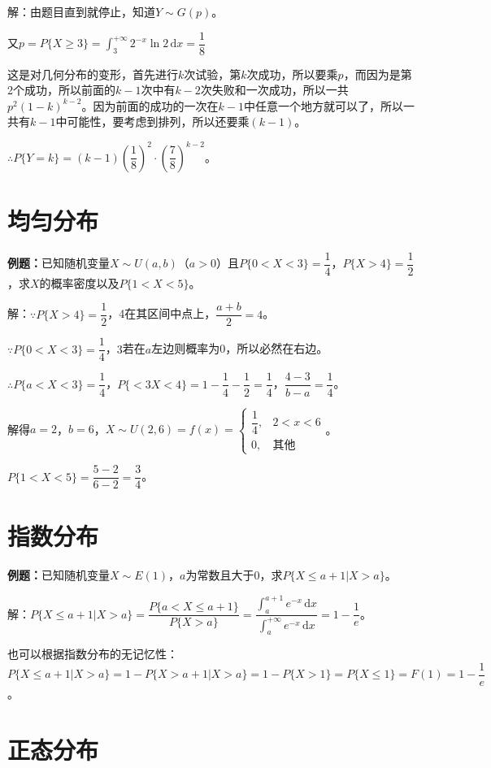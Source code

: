 \documentclass[UTF8, 12pt]{ctexart}
\begin{document}
解：由题目直到就停止，知道$Y\sim G(p)$。

又$p=P\{X\geqslant3\}=\int_3^{+\infty}2^{-x}\ln2\,\textrm{d}x=\dfrac{1}{8}$

这是对几何分布的变形，首先进行$k$次试验，第$k$次成功，所以要乘$p$，而因为是第2个成功，所以前面的$k-1$次中有$k-2$次失败和一次成功，所以一共$p^2(1-k)^{k-2}$。因为前面的成功的一次在$k-1$中任意一个地方就可以了，所以一共有$k-1$中可能性，要考虑到排列，所以还要乘$(k-1)$。

$\therefore P\{Y=k\}=(k-1)\left(\dfrac{1}{8}\right)^2\cdot\left(\dfrac{7}{8}\right)^{k-2}$。

\section{均匀分布}

\textbf{例题：}已知随机变量$X\sim U(a,b)$（$a>0$）且$P\{0<X<3\}=\dfrac{1}{4}$，$P\{X>4\}=\dfrac{1}{2}$，求$X$的概率密度以及$P\{1<X<5\}$。

解：$\because P\{X>4\}=\dfrac{1}{2}$，4在其区间中点上，$\dfrac{a+b}{2}=4$。

$\because P\{0<X<3\}=\dfrac{1}{4}$，$3$若在$a$左边则概率为0，所以必然在右边。

$\therefore P\{a<X<3\}=\dfrac{1}{4}$，$P\{<3X<4\}=1-\dfrac{1}{4}-\dfrac{1}{2}=\dfrac{1}{4}$，$\dfrac{4-3}{b-a}=\dfrac{1}{4}$。

解得$a=2$，$b=6$，$X\sim U(2,6)=f(x)=\left\{\begin{array}{ll}
    \dfrac{1}{4}, & 2<x<6 \\
    0, & \text{其他}
\end{array}\right.$。

$P\{1<X<5\}=\dfrac{5-2}{6-2}=\dfrac{3}{4}$。

\section{指数分布}

\textbf{例题：}已知随机变量$X\sim E(1)$，$a$为常数且大于0，求$P\{X\leqslant a+1|X>a\}$。

解：$P\{X\leqslant a+1|X>a\}=\dfrac{P\{a<X\leqslant a+1\}}{P\{X>a\}}=\dfrac{\int_a^{a+1}e^{-x}\,\textrm{d}x}{\int_a^{+\infty}e^{-x}\,\textrm{d}x}=1-\dfrac{1}{e}$。

也可以根据指数分布的无记忆性：$P\{X\leqslant a+1|X>a\}=1-P\{X>a+1|X>a\}=1-P\{X>1\}=P\{X\leqslant1\}=F(1)=1-\dfrac{1}{e}$。

\section{正态分布}
\end{document}
